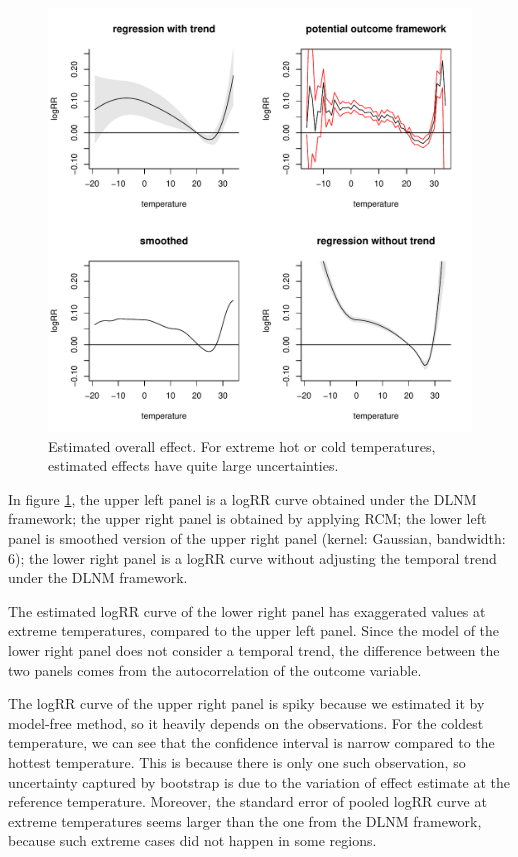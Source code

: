 \documentclass[12pt]{article}
\begin{document}
\begin{figure}
	\includegraphics[width = \textwidth]{figures/main1.pdf}
	\caption{Estimated overall effect. 
	For extreme hot or cold temperatures, estimated effects have quite large uncertainties.}
	\label{figure:main}
\end{figure}

In figure \ref{figure:main},
the upper left panel is a logRR curve obtained under the DLNM framework;
the upper right panel is obtained by applying RCM;
the lower left panel is smoothed version of the upper right panel (kernel: Gaussian, bandwidth: $6$);
the lower right panel is a logRR curve without adjusting the temporal trend under the DLNM framework.

The estimated logRR curve of the lower right panel has exaggerated values at extreme temperatures,
compared to the upper left panel.
Since the model of the lower right panel does not consider a temporal trend,
the difference between the two panels comes from the autocorrelation of the outcome variable.

The logRR curve of the upper right panel is spiky
because we estimated it by model-free method, so it heavily depends on the observations.
For the coldest temperature, 
we can see that the confidence interval is narrow compared to the hottest temperature.
This is because there is only one such observation,
so uncertainty captured by bootstrap is due to the variation of effect estimate at the reference temperature.
Moreover, the standard error of pooled logRR curve at extreme temperatures
seems larger than the one from the DLNM framework,
because such extreme cases did not happen in some regions.
\end{document}
